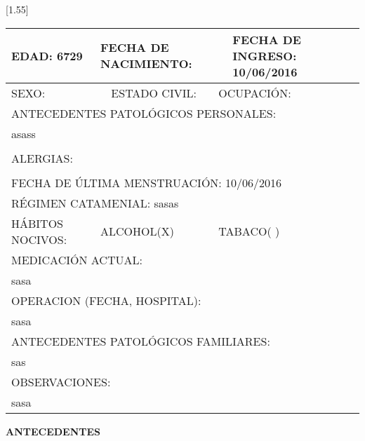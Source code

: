 \documentclass[10pt,a4paper]{article}
\begin{document}
\vspace{0.5cm}
\scalebox{1.40}[1.55]{
\begin{tabular}{|p{2cm}p{2cm}p{3cm}p{2cm}|} 
\hline 
\multicolumn{1}{|l}{\scriptsize{EDAD: 6729}}& \multicolumn{2}{l}{ \scriptsize{FECHA DE NACIMIENTO: }}& \multicolumn{1}{l|}{ \scriptsize{FECHA DE INGRESO: 10/06/2016}}\\
\hline 
\multicolumn{1}{|l}{\scriptsize{SEXO: }}& \multicolumn{1}{c}{ \scriptsize{ESTADO CIVIL: }}& \multicolumn{2}{p{6cm}|}{ \scriptsize{OCUPACI\'ON: }}\\  
\hline 
\multicolumn{4}{|l|}{\scriptsize{ANTECEDENTES PATOL\'OGICOS PERSONALES:}}\\
\multicolumn{4}{|p{12.5cm}|}{\scriptsize{asass}}\\ 
 & && \\
\hline 
\multicolumn{4}{|l|}{\scriptsize{ALERGIAS:}}\\ 
\multicolumn{4}{|p{12.5cm}|}{\scriptsize{}}\\ 
\hline 
\multicolumn{4}{|l|}{\scriptsize{FECHA DE \'ULTIMA MENSTRUACI\'ON: 10/06/2016}}\\ 
\hline 
\multicolumn{4}{|l|}{\scriptsize{R\'EGIMEN CATAMENIAL: sasas}}\\
\hline 
\multicolumn{1}{|l}{\scriptsize{H\'ABITOS NOCIVOS:}}& \multicolumn{1}{l}{\scriptsize{ALCOHOL(X)}}&\multicolumn{2}{l|}{\scriptsize{TABACO( )}}\\
\hline 
\multicolumn{4}{|l|}{\scriptsize{MEDICACI\'ON ACTUAL:}}\\
\multicolumn{4}{|p{12.5cm}|}{\scriptsize{sasa}}\\ 
\hline 
\multicolumn{4}{|l|}{\scriptsize{OPERACION (FECHA, HOSPITAL): }}\\
\multicolumn{4}{|p{12.5cm}|}{\scriptsize{sasa}}\\ 
\hline 
\multicolumn{4}{|l|}{\scriptsize{ANTECEDENTES PATOL\'OGICOS FAMILIARES:}}\\
\multicolumn{4}{|p{12.5cm}|}{\scriptsize{sas}}\\ 
\hline 
\multicolumn{4}{|l|}{\scriptsize{OBSERVACIONES:}}\\
\multicolumn{4}{|p{12.5cm}|}{\scriptsize{sasa}}\\ 
\hline 
\end{tabular}}
\vspace{0.6cm}
\hspace{13cm}
\begin{flushleft}
\begin{LARGE}
\textbf{ANTECEDENTES}
\end{LARGE}
\end{flushleft}
\end{document}
